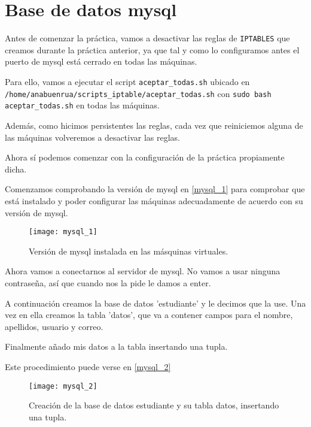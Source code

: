 
\chapter{Base de datos mysql}

Antes de comenzar la práctica, vamos a desactivar las reglas de \verb|IPTABLES| que creamos durante la práctica anterior, ya que tal y como lo configuramos antes el puerto de mysql está cerrado en todas las máquinas.

Para ello, vamos a ejecutar el script \verb|aceptar_todas.sh| ubicado en \verb|/home/anabuenrua/scripts_iptable/aceptar_todas.sh| con \verb|sudo bash aceptar_todas.sh| en todas las máquinas.

Además, como hicimos persistentes las reglas, cada vez que reiniciemos alguna de las máquinas volveremos a desactivar las reglas.

Ahora sí podemos comenzar con la configuración de la práctica propiamente dicha.

Comenzamos comprobando la versión de mysql en \eqref{mysql_1} para comprobar que está instalado y poder configurar las máquinas adecuadamente de acuerdo con su versión de mysql.

\begin{figure}[h!]
\begin{center}
\caption{Versión de mysql instalada en las másquinas virtuales.}
\label{mysql_1}
\texttt{[image: mysql\_1]}
\end{center}
\end{figure}

Ahora vamos a conectarnos al servidor de mysql. No vamos a usar ninguna contraseña, así que cuando nos la pide le damos a enter.

A continuación creamos la base de datos 'estudiante' y le decimos que la use. Una vez en ella creamos la tabla 'datos', que va a contener campos para el nombre, apellidos, usuario y correo.

Finalmente añado mis datos a la tabla insertando una tupla.

Este procedimiento puede verse en \eqref{mysql_2}

\begin{figure}[h!]
\begin{center}
\caption{Creación de la base de datos estudiante y su tabla datos, insertando una tupla.}
\label{mysql_2}
\texttt{[image: mysql\_2]}
\end{center}
\end{figure}



